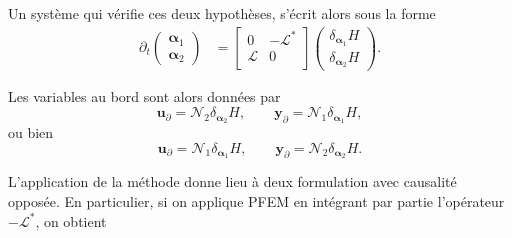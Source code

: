 Un système qui vérifie ces deux hypothèses, s'écrit alors sous la forme
\begin{equation*}
	\begin{aligned}
	\partial_t \begin{pmatrix}
	{\bm{\alpha}}_1 \\ {\bm{\alpha}}_2
	\end{pmatrix} &= \begin{bmatrix}
	0 & - \mathcal{L}^* \\
	\mathcal{L} & 0 \\
	\end{bmatrix}\begin{pmatrix}
	\delta_{\bm{\alpha}_1}H \\ \delta_{\bm{\alpha}_2}H
	\end{pmatrix}.
	\end{aligned}
\end{equation*}

Les variables au bord sont alors données par
\begin{equation*}
\bm{u}_\partial = \mathcal{N}_2 \displaystyle \delta_{\bm{\alpha}_2}H, \qquad  \bm{y}_\partial = \mathcal{N}_1 \displaystyle \delta_{\bm{\alpha}_1}H, 
\end{equation*}
ou bien
\begin{equation*}
\bm{u}_\partial = \mathcal{N}_1 \displaystyle \delta_{\bm{\alpha}_1}H, \qquad 
\bm{y}_\partial = \mathcal{N}_2 \displaystyle \delta_{\bm{\alpha}_2}H.
\end{equation*}

L'application de la méthode donne lieu à deux formulation avec causalité opposée. En particulier, si on applique PFEM en intégrant par partie l'opérateur $-\mathcal{L}^*$, on obtient


